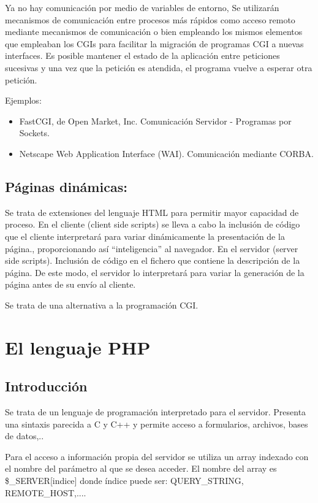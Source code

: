 \documentclass{apuntes}
\begin{document}
Ya no hay comunicación por medio de variables de entorno, Se utilizarán mecanismos de comunicación entre procesos más rápidos como acceso remoto mediante mecanismos de comunicación o bien empleando los mismos elementos que empleaban los CGIs para facilitar la migración de programas CGI a nuevas interfaces.
Es posible mantener el estado de la aplicación entre peticiones sucesivas y una vez que la petición es atendida, el programa vuelve a esperar otra petición.

Ejemplos:
\begin{itemize}
\item FastCGI, de Open Market, Inc. Comunicación Servidor - Programas por Sockets.
\item Netscape Web Application Interface (WAI). Comunicación mediante CORBA.
\end{itemize}

\subsection{Páginas dinámicas:}
Se trata de extensiones del lenguaje HTML para permitir mayor capacidad de proceso. En el cliente (client side scripts) se lleva a cabo la inclusión de código que el cliente interpretará para variar dinámicamente la presentación de la página., proporcionando así “inteligencia” al navegador. En el servidor (server side scripts). Inclusión de código en el fichero que contiene la descripción de la página. De este modo, el servidor lo interpretará para variar la generación de la página antes de su envío al cliente.

Se trata de una alternativa a la programación CGI.

\section{El lenguaje PHP}
\subsection{Introducción}
Se trata de un lenguaje de programación interpretado para el servidor. Presenta una sintaxis parecida a C y C++ y permite acceso a formularios, archivos, bases de datos,..

Para el acceso a información propia del servidor se utiliza un  array indexado con el nombre del parámetro al que se desea acceder. El nombre del array es \$\_SERVER[indice] donde índice puede ser: QUERY\_STRING, REMOTE\_HOST,....
\end{document}
